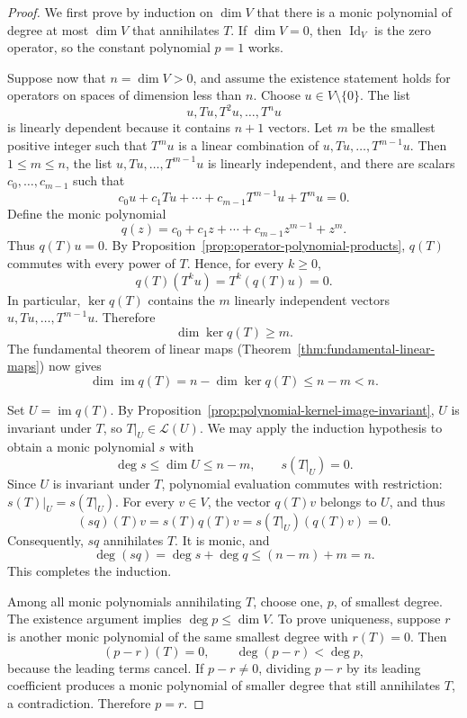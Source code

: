 \begin{proof}
  We first prove by induction on $\dim V$ that there is a monic
  polynomial of degree at most $\dim V$ that annihilates $T$.
  If $\dim V=0$, then $\operatorname{Id}_V$ is the zero operator,
  so the constant polynomial $p=1$ works.

  Suppose now that $n=\dim V>0$, and assume the existence statement
  holds for operators on spaces of dimension less than $n$.
  Choose $u\in V\setminus\{0\}$. The list
  \[
    u,Tu,T^2u,\ldots,T^nu
  \]
  is linearly dependent because it contains $n+1$ vectors. Let $m$
  be the smallest positive integer such that $T^mu$ is a linear
  combination of $u,Tu,\ldots,T^{m-1}u$. Then $1\leq m\leq n$,
  the list $u,Tu,\ldots,T^{m-1}u$ is linearly independent, and
  there are scalars $c_0,\ldots,c_{m-1}$ such that
  \[
    c_0u+c_1Tu+\cdots+c_{m-1}T^{m-1}u+T^mu=0.
  \]
  Define the monic polynomial
  \[
    q(z)=c_0+c_1z+\cdots+c_{m-1}z^{m-1}+z^m.
  \]
  Thus $q(T)u=0$. By
  Proposition~\ref{prop:operator-polynomial-products}, $q(T)$
  commutes with every power of $T$. Hence, for every $k\geq0$,
  \[
    q(T)(T^ku)=T^k(q(T)u)=0.
  \]
  In particular, $\ker q(T)$ contains the $m$ linearly independent
  vectors $u,Tu,\ldots,T^{m-1}u$. Therefore
  \[
    \dim\ker q(T)\geq m.
  \]
  The fundamental theorem of linear maps
  (Theorem~\ref{thm:fundamental-linear-maps}) now gives
  \[
    \dim\operatorname{im}q(T)
      =n-\dim\ker q(T)\leq n-m<n.
  \]

  Set $U=\operatorname{im}q(T)$. By
  Proposition~\ref{prop:polynomial-kernel-image-invariant}, $U$
  is invariant under $T$, so $T|_U\in\mathcal L(U)$. We may apply
  the induction hypothesis to obtain a monic polynomial $s$ with
  \[
    \deg s\leq\dim U\leq n-m,
    \qquad s(T|_U)=0.
  \]
  Since $U$ is invariant under $T$, polynomial evaluation commutes
  with restriction: $s(T)|_U=s(T|_U)$. For every $v\in V$, the
  vector $q(T)v$ belongs to $U$, and thus
  \[
    (sq)(T)v=s(T)q(T)v=s(T|_U)(q(T)v)=0.
  \]
  Consequently, $sq$ annihilates $T$. It is monic, and
  \[
    \deg(sq)=\deg s+\deg q\leq(n-m)+m=n.
  \]
  This completes the induction.

  Among all monic polynomials annihilating $T$, choose one, $p$,
  of smallest degree. The existence argument implies
  $\deg p\leq\dim V$. To prove uniqueness, suppose $r$ is another
  monic polynomial of the same smallest degree with $r(T)=0$.
  Then
  \[
    (p-r)(T)=0,\qquad \deg(p-r)<\deg p,
  \]
  because the leading terms cancel. If $p-r\neq0$, dividing
  $p-r$ by its leading coefficient produces a monic polynomial
  of smaller degree that still annihilates $T$, a contradiction.
  Therefore $p=r$.
\end{proof}

